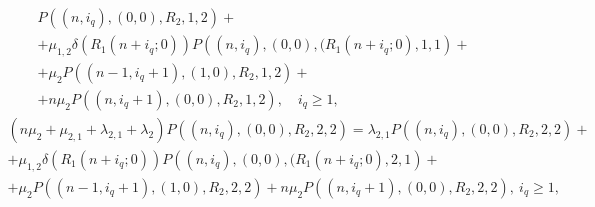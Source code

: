 {\begin{multline}
  P\left((n,i_q),(0,0),R_2,1,2\right)+ \\+
  \mu_{1,2}\delta\left(R_1(n+i_q;0)\right)
  P\left((n,i_q),(0,0),(R_1(n+i_q;0),1,1\right)+\\ +
  \mu_2 P\left((n-1,i_q+1),(1,0),R_2,1,2\right)+ \\+ n\mu_2
  P\left((n,i_q+1),(0,0),R_2,1,2\right), \quad i_q\geqslant 1,
\label{eq:4.3}
\end{multline}
\begin{multline}
  \left(n\mu_2+\mu_{2,1}+\lambda_{2,1}+\lambda_2\right)
  P\left((n,i_q),(0,0),R_2,2,2\right) =  \lambda_{2,1}
  P\left((n,i_q),(0,0),R_2,2,2\right)+ \\ +
  \mu_{1,2}\delta\left(R_1(n+i_q;0)\right)
  P\left((n,i_q),(0,0),(R_1(n+i_q;0),2,1\right)+\\ +
  \mu_2 P\left((n-1,i_q+1),(1,0),R_2,2,2\right)+ n\mu_2
  P\left((n,i_q+1),(0,0),R_2,2,2\right), \ i_q\geqslant 1,
\label{eq:4.4}
\end{multline}

}
